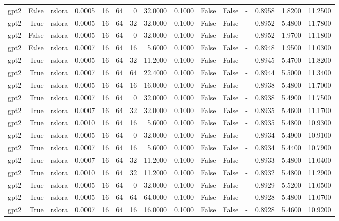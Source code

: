 \begin{tabular}{lrlrrrrrrlllrrr}
gpt2 & False & rslora & 0.0005 & 16 & 64 & 0 & 32.0000 & 0.1000 & False & False & - & 0.8958 & 1.8200 & 11.2500 \\
gpt2 & True & rslora & 0.0005 & 16 & 64 & 32 & 32.0000 & 0.1000 & False & False & - & 0.8952 & 5.4800 & 11.7800 \\
gpt2 & False & rslora & 0.0005 & 16 & 64 & 0 & 32.0000 & 0.1000 & False & False & - & 0.8952 & 1.9700 & 11.1800 \\
gpt2 & False & rslora & 0.0007 & 16 & 64 & 16 & 5.6000 & 0.1000 & False & False & - & 0.8948 & 1.9500 & 11.0300 \\
gpt2 & True & rslora & 0.0005 & 16 & 64 & 32 & 11.2000 & 0.1000 & False & False & - & 0.8945 & 5.4700 & 11.8200 \\
gpt2 & True & rslora & 0.0007 & 16 & 64 & 64 & 22.4000 & 0.1000 & False & False & - & 0.8944 & 5.5000 & 11.3400 \\
gpt2 & True & rslora & 0.0005 & 16 & 64 & 16 & 16.0000 & 0.1000 & False & False & - & 0.8938 & 5.4800 & 11.7000 \\
gpt2 & True & rslora & 0.0007 & 16 & 64 & 0 & 32.0000 & 0.1000 & False & False & - & 0.8938 & 5.4900 & 11.7500 \\
gpt2 & True & rslora & 0.0007 & 16 & 64 & 32 & 32.0000 & 0.1000 & False & False & - & 0.8935 & 5.4600 & 11.1700 \\
gpt2 & True & rslora & 0.0010 & 16 & 64 & 16 & 5.6000 & 0.1000 & False & False & - & 0.8935 & 5.4800 & 10.9300 \\
gpt2 & True & rslora & 0.0005 & 16 & 64 & 0 & 32.0000 & 0.1000 & False & False & - & 0.8934 & 5.4900 & 10.9100 \\
gpt2 & True & rslora & 0.0007 & 16 & 64 & 16 & 5.6000 & 0.1000 & False & False & - & 0.8934 & 5.4400 & 10.7900 \\
gpt2 & True & rslora & 0.0007 & 16 & 64 & 32 & 11.2000 & 0.1000 & False & False & - & 0.8933 & 5.4800 & 11.0400 \\
gpt2 & True & rslora & 0.0010 & 16 & 64 & 32 & 11.2000 & 0.1000 & False & False & - & 0.8932 & 5.4800 & 11.2900 \\
gpt2 & True & rslora & 0.0005 & 16 & 64 & 0 & 32.0000 & 0.1000 & False & False & - & 0.8929 & 5.5200 & 11.0500 \\
gpt2 & True & rslora & 0.0005 & 16 & 64 & 64 & 64.0000 & 0.1000 & False & False & - & 0.8928 & 5.4800 & 11.0700 \\
gpt2 & True & rslora & 0.0007 & 16 & 64 & 16 & 16.0000 & 0.1000 & False & False & - & 0.8928 & 5.4600 & 10.9200 \\

\end{tabular}
